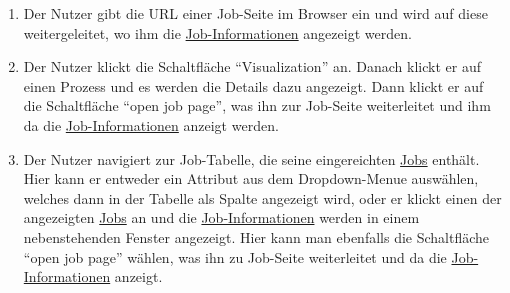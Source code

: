 \begin{enumerate}
   

\item Der \gls{Nutzer} gibt die URL einer Job-Seite im Browser ein und wird auf diese weitergeleitet, wo ihm die \hyperref[B:Job-Informationen]{Job-Informationen} angezeigt werden.

\item Der \gls{Nutzer} klickt die Schaltfläche \enquote{Visualization} an. Danach klickt er auf einen Prozess und es werden die Details dazu angezeigt. Dann klickt er auf die Schaltfläche \enquote{open job page}, was ihn zur Job-Seite weiterleitet und ihm da die \hyperref[B:Job-Informationen]{Job-Informationen} anzeigt werden.

\item Der \gls{Nutzer} navigiert zur Job-Tabelle, die seine eingereichten \hyperref[B:Jobs]{Jobs} enthält. Hier kann er entweder ein Attribut aus dem \gls{Dropdown-Menue} auswählen, welches dann in der Tabelle als Spalte angezeigt wird, oder er klickt einen der angezeigten \hyperref[B:Jobs]{Jobs} an und die \hyperref[B:Job-Informationen]{Job-Informationen} werden in einem nebenstehenden Fenster angezeigt. Hier kann man ebenfalls die Schaltfläche \enquote{open job page} wählen, was ihn zu Job-Seite weiterleitet und da die \hyperref[B:Job-Informationen]{Job-Informationen} anzeigt.
\end{enumerate}